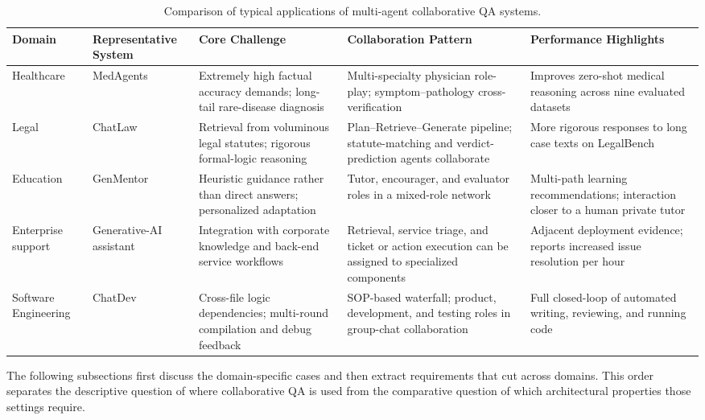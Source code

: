 \documentclass[a4paper,fleqn]{cas-dc}
\begin{document}
\begin{table}[pos=t]
  \centering
  \caption{Comparison of typical applications of multi-agent collaborative QA systems.}
  \label{tab:app_compare}
  \scriptsize
  \setlength{\tabcolsep}{3pt}
  \begin{tabular}{p{1.8cm} p{2.4cm} p{4.0cm} p{4.0cm} p{4.0cm}}
    \toprule
    \textbf{Domain} & \textbf{Representative System} &
    \textbf{Core Challenge} & \textbf{Collaboration Pattern} &
    \textbf{Performance Highlights} \\
    \midrule
    Healthcare &
      MedAgents \citep{tang2024medagents} &
      Extremely high factual accuracy demands; long-tail rare-disease diagnosis &
      Multi-specialty physician role-play; symptom--pathology cross-verification &
      Improves zero-shot medical reasoning across nine evaluated datasets \\[6pt]
    Legal &
      ChatLaw \citep{cui2023chatlaw} &
      Retrieval from voluminous legal statutes; rigorous formal-logic reasoning &
      Plan--Retrieve--Generate pipeline; statute-matching and verdict-prediction agents collaborate &
      More rigorous responses to long case texts on LegalBench \\[6pt]
    Education &
      GenMentor \citep{li2024genmentor} &
      Heuristic guidance rather than direct answers; personalized adaptation &
      Tutor, encourager, and evaluator roles in a mixed-role network &
      Multi-path learning recommendations; interaction closer to a human private tutor \\[6pt]
    Enterprise support &
      Generative-AI assistant \citep{brynjolfsson2023generative_ai_work} &
      Integration with corporate knowledge and back-end service workflows &
      Retrieval, service triage, and ticket or action execution can be assigned to specialized components &
      Adjacent deployment evidence; reports increased issue resolution per hour \\[6pt]
    Software Engineering &
      ChatDev \citep{qian2023chatdev} &
      Cross-file logic dependencies; multi-round compilation and debug feedback &
      SOP-based waterfall; product, development, and testing roles in group-chat collaboration &
      Full closed-loop of automated writing, reviewing, and running code \\
    \bottomrule
  \end{tabular}
\end{table}

The following subsections first discuss the domain-specific cases and then
extract requirements that cut across domains. This order separates the
descriptive question of where collaborative QA is used from the comparative
question of which architectural properties those settings require.
\end{document}
